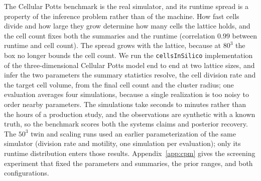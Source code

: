 \documentclass[10pt]{article}
\theoremstyle{plain}
\theoremstyle{definition}
\begin{document}
The Cellular Potts benchmark is the real simulator, and its runtime spread is a property of the inference problem rather than of the machine. How fast cells divide and how large they grow determine how many cells the lattice holds, and the cell count fixes both the summaries and the runtime (correlation $0.99$ between runtime and cell count). The spread grows with the lattice, because at $80^3$ the box no longer bounds the cell count. We run the \texttt{cellsInSilico} implementation \citep{berghoff2020cis} of the three-dimensional Cellular Potts model \citep{graner1992cpm} end to end at two lattice sizes, and infer the two parameters the summary statistics resolve, the cell division rate and the target cell volume, from the final cell count and the cluster radius; one evaluation averages four simulations, because a single realization is too noisy to order nearby parameters. The simulations take seconds to minutes rather than the hours of a production study, and the observations are synthetic with a known truth, so the benchmark scores both the systems claims and posterior recovery. The $50^3$ twin and scaling runs used an earlier parameterization of the same simulator (division rate and motility, one simulation per evaluation); only its runtime distribution enters those results. Appendix~\ref{app:cpm} gives the screening experiment that fixed the parameters and summaries, the prior ranges, and both configurations.
\end{document}
